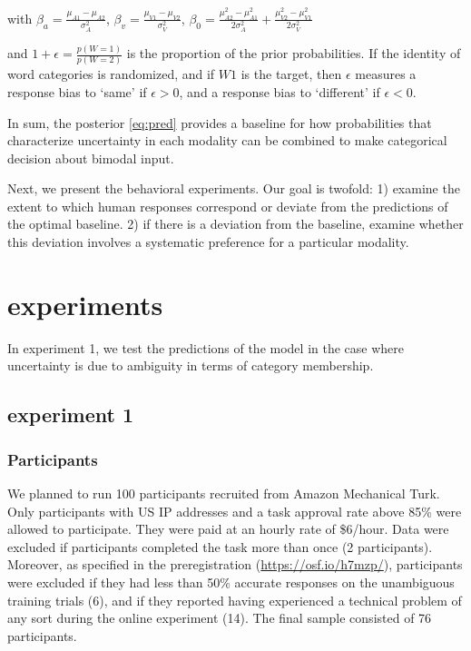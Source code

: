 \documentclass[10pt,letterpaper]{article}
\begin{document}
with $\beta_a=\frac{\mu_{A1}-\mu_{A2}}{\sigma^2_{A}}$, 
$\beta_v=\frac{\mu_{V1}-\mu_{V2}}{\sigma^2_{V}}$,
$\beta_0=\frac{\mu^2_{A2}-\mu^2_{A1}}{2\sigma^2_{A}}+\frac{\mu^2_{V2}-\mu^2_{V1}}{2\sigma^2_{V}}$

and $1+\epsilon=\frac{p(W=1)}{p(W=2)}$ is the proportion of the prior probabilities. If the identity of word categories is randomized, and if $W1$ is the target, then $\epsilon$ measures a response bias to `same' if $\epsilon > 0 $, and a response bias to `different' if $\epsilon < 0 $.

In sum, the posterior \ref{eq:pred} provides a baseline for how probabilities that characterize uncertainty in each modality can be combined to make categorical decision about bimodal input.

Next, we present the behavioral experiments. Our goal is twofold: 1) examine the extent to which human responses correspond or deviate from the predictions of the optimal baseline. 2) if there is a deviation from the baseline, examine whether this deviation involves a systematic preference for a particular modality.

\section{experiments}

In experiment 1, we test the predictions of the model in the case where uncertainty is due to ambiguity in terms of category membership. 

\subsection{experiment 1}

\subsubsection{Participants}
We planned to run 100 participants recruited from Amazon Mechanical Turk. Only participants with US IP addresses and a task approval rate above 85\% were allowed to participate. They were paid at an hourly rate of \$6/hour.  Data
were excluded if participants completed the task more than
once (2 participants). Moreover, as specified in the preregistration (\url{https://osf.io/h7mzp/}), participants were excluded if they had less than 50\% accurate responses on the unambiguous training trials (6), and if they reported having experienced a technical problem of any sort during the online experiment (14). The final sample consisted of 76 participants.
\end{document}
